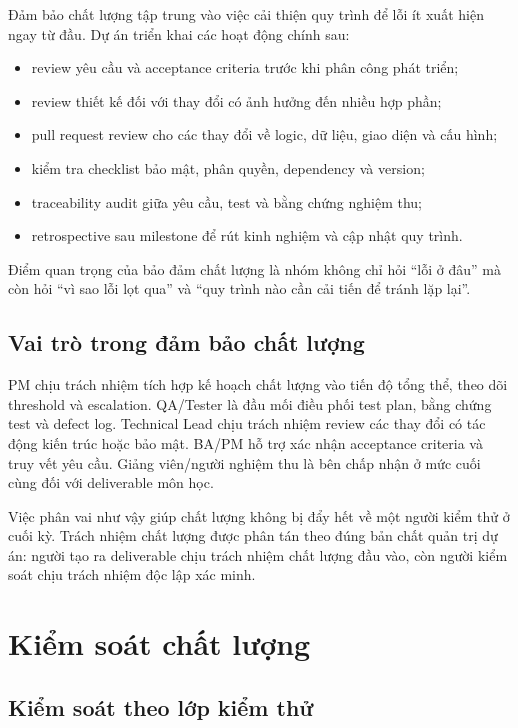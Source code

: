 Đảm bảo chất lượng tập trung vào việc cải thiện quy trình để lỗi ít xuất hiện ngay từ đầu. Dự án triển khai các hoạt động chính sau:

\begin{itemize}
  \item review yêu cầu và acceptance criteria trước khi phân công phát triển;
  \item review thiết kế đối với thay đổi có ảnh hưởng đến nhiều hợp phần;
  \item pull request review cho các thay đổi về logic, dữ liệu, giao diện và cấu hình;
  \item kiểm tra checklist bảo mật, phân quyền, dependency và version;
  \item traceability audit giữa yêu cầu, test và bằng chứng nghiệm thu;
  \item retrospective sau milestone để rút kinh nghiệm và cập nhật quy trình.
\end{itemize}

Điểm quan trọng của bảo đảm chất lượng là nhóm không chỉ hỏi ``lỗi ở đâu'' mà còn hỏi ``vì sao lỗi lọt qua'' và ``quy trình nào cần cải tiến để tránh lặp lại''.

\subsection{Vai trò trong đảm bảo chất lượng}

PM chịu trách nhiệm tích hợp kế hoạch chất lượng vào tiến độ tổng thể, theo dõi threshold và escalation. QA/Tester là đầu mối điều phối test plan, bằng chứng test và defect log. Technical Lead chịu trách nhiệm review các thay đổi có tác động kiến trúc hoặc bảo mật. BA/PM hỗ trợ xác nhận acceptance criteria và truy vết yêu cầu. Giảng viên/người nghiệm thu là bên chấp nhận ở mức cuối cùng đối với deliverable môn học.

Việc phân vai như vậy giúp chất lượng không bị đẩy hết về một người kiểm thử ở cuối kỳ. Trách nhiệm chất lượng được phân tán theo đúng bản chất quản trị dự án: người tạo ra deliverable chịu trách nhiệm chất lượng đầu vào, còn người kiểm soát chịu trách nhiệm độc lập xác minh.

\fi
\section{Kiểm soát chất lượng}

\subsection{Kiểm soát theo lớp kiểm thử}

